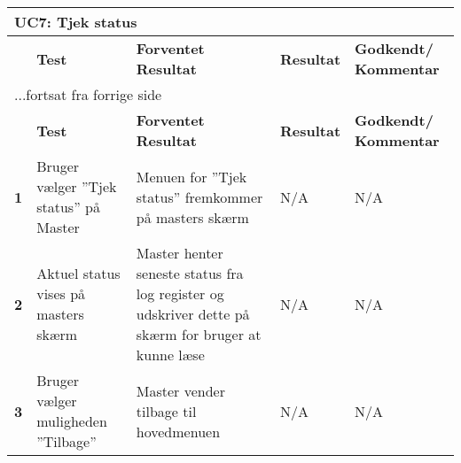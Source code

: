 \begin{center}
\begin{longtable}{|p{}|p{}|p{}|p{}|p{}|} %
\hline
\multicolumn{5}{|l|}{\textbf{UC7: Tjek status}} \\ \hline
\multicolumn{1}{|c|}{} &
\textbf{Test} &
\textbf{Forventet \newline Resultat} &
\textbf{Resultat} &
\textbf{Godkendt/ \newline Kommentar} \\ \hline 
\endfirsthead

\multicolumn{5}{l}{...fortsat fra forrige side} \\ \hline 
\multicolumn{1}{|c|}{} &
\textbf{Test} &
\textbf{Forventet \newline Resultat} &
\textbf{Resultat} &
\textbf{Godkendt/ \newline Kommentar} \\ \hline 
\endhead

\textbf{1}	&Bruger vælger ''Tjek status'' på Master
			&Menuen for ''Tjek status'' fremkommer på masters skærm
			&N/A
			&N/A \\ \hline 
			
\textbf{2}	&Aktuel status vises på masters skærm
			&Master henter seneste status fra log register og udskriver dette på skærm for bruger at kunne læse
			&N/A
			&N/A \\ \hline 

\textbf{3}	&Bruger vælger muligheden ''Tilbage''
			&Master vender tilbage til hovedmenuen
			&N/A
			&N/A \\ \hline 
			
\end{longtable}
	\label{ATUC7} 
\end{center}
